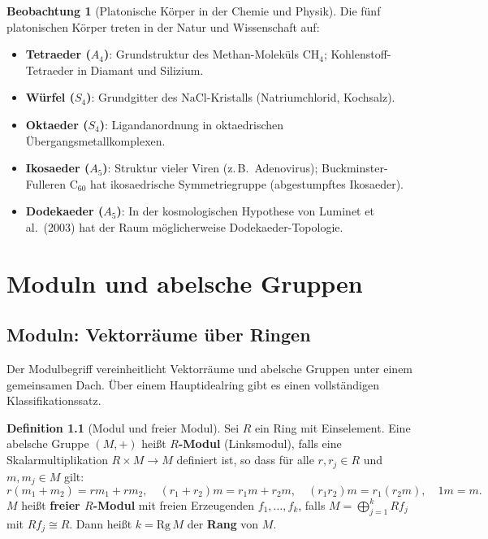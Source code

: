﻿\documentclass[a4paper,12pt]{report}
\theoremstyle{definition}
\newtheorem{definition}{Definition}
\newtheorem{beobachtung}{Beobachtung}
\begin{document}
\begin{beobachtung}[Platonische Körper in der Chemie und Physik]
    Die fünf platonischen Körper treten in der Natur und Wissenschaft auf:
    \begin{itemize}
        \item[-] \textbf{Tetraeder ($A_4$)}: Grundstruktur des
              Methan-Moleküls $\mathrm{CH}_4$; Kohlenstoff-Tetraeder
              in Diamant und Silizium.
        \item[-] \textbf{Würfel ($S_4$)}: Grundgitter des $\mathrm{NaCl}$-Kristalls
              (Natriumchlorid, Kochsalz).
        \item[-] \textbf{Oktaeder ($S_4$)}: Ligandanordnung in
              oktaedrischen Übergangsmetallkomplexen.
        \item[-] \textbf{Ikosaeder ($A_5$)}: Struktur vieler Viren
              (z.\,B.\ Adenovirus); Buckminster-Fulleren $\mathrm{C}_{60}$
              hat ikosaedrische Symmetriegruppe (abgestumpftes Ikosaeder).
        \item[-] \textbf{Dodekaeder ($A_5$)}: In der kosmologischen
              Hypothese von Luminet et al.\ (2003) hat der Raum möglicherweise
              Dodekaeder-Topologie.
    \end{itemize}
\end{beobachtung}

\chapter{Moduln und abelsche Gruppen}

\section{Moduln: Vektorräume über Ringen}

Der Modulbegriff vereinheitlicht Vektorräume und abelsche Gruppen
unter einem gemeinsamen Dach. Über einem Hauptidealring gibt es
einen vollständigen Klassifikationssatz.

\begin{definition}[Modul und freier Modul]
    Sei $R$ ein Ring mit Einselement. Eine abelsche Gruppe $(M, +)$
    heißt \textbf{$R$-Modul} (Linksmodul), falls eine Skalarmultiplikation
    $R \times M \to M$ definiert ist, so dass für alle $r, r_j \in R$
    und $m, m_j \in M$ gilt:
    \[
        r(m_1 + m_2) = rm_1 + rm_2, \quad
        (r_1 + r_2)m = r_1 m + r_2 m, \quad
        (r_1 r_2)m = r_1(r_2 m), \quad
        1m = m.
    \]
    $M$ heißt \textbf{freier $R$-Modul} mit freien Erzeugenden
    $f_1, \dots, f_k$, falls $M = \bigoplus_{j=1}^k R f_j$ mit
    $Rf_j \cong R$. Dann heißt $k = \mathrm{Rg}\, M$ der \textbf{Rang}
    von $M$.
\end{definition}
\end{document}
